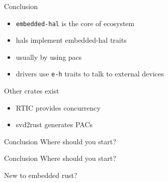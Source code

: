 \documentclass[169]{beamer}
\begin{document}
\begin{frame}{Conclusion}
    \begin{itemize}
        \item \texttt{embedded-hal} is the core of ecosystem
        \item hals implement embedded-hal traits
        \item usually by using pacs
        \item drivers use \texttt{e-h} traits to talk to external devices
    \end{itemize}
    Other crates exist
    \begin{itemize}
        \item{RTIC provides concurrency}
        \item{svd2rust generates PACs}
    \end{itemize}
\end{frame}

\begin{frame}{Conclusion}
    Where should you start?
\end{frame}

\begin{frame}{Conclusion}
    Where should you start?

    New to embedded rust?
\end{frame}
\end{document}
